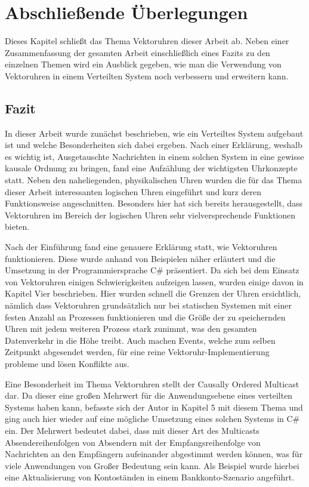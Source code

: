 \section{Abschließende Überlegungen}
\label{cap:schluss}
Dieses Kapitel schließt das Thema Vektoruhren dieser Arbeit ab. Neben einer Zusammenfassung der gesamten Arbeit einschließlich eines Fazits zu den einzelnen Themen wird ein Ausblick gegeben, wie man die Verwendung von Vektoruhren in einem Verteilten System noch verbessern und erweitern kann.
\subsection{Fazit}
In dieser Arbeit wurde zunächst beschrieben, wie ein Verteiltes System aufgebaut ist und welche Besonderheiten sich dabei ergeben. Nach einer Erklärung, weshalb es wichtig ist, Ausgetauschte Nachrichten in einem solchen System in eine gewisse kausale Ordnung zu bringen, fand eine Aufzählung der wichtigsten Uhrkonzepte statt. Neben den naheliegenden, physikalischen Uhren wurden die für das Thema dieser Arbeit interessanten logischen Uhren eingeführt und kurz deren Funktionsweise angeschnitten. Besonders hier hat sich bereits herausgestellt, dass Vektoruhren im Bereich der logischen Uhren sehr vielversprechende Funktionen bieten.

Nach der Einführung fand eine genauere Erklärung statt, wie Vektoruhren funktionieren. Diese wurde anhand von Beispielen näher erläutert und die Umsetzung in der Programmiersprache C\# präsentiert. Da sich bei dem Einsatz von Vektoruhren einigen Schwierigkeiten aufzeigen lassen, wurden einige davon in Kapitel Vier beschrieben. Hier wurden schnell die Grenzen der Uhren ersichtlich, nämlich dass Vektoruhren grundsätzlich nur bei statischen Systemen mit einer festen Anzahl an Prozessen funktionieren und die Größe der zu speichernden Uhren mit jedem weiteren Prozess stark zunimmt, was den gesamten Datenverkehr in die Höhe treibt. Auch machen Events, welche zum selben Zeitpunkt abgesendet werden, für eine reine Vektoruhr-Implementierung probleme und lösen Konflikte aus.

Eine Besonderheit im Thema Vektoruhren stellt der Causally Ordered Multicast dar. Da dieser eine großen Mehrwert für die Anwendungsebene eines verteilten Systems haben kann, befasste sich der Autor in Kapitel 5 mit diesem Thema und ging auch hier wieder auf eine mögliche Umsetzung eines solchen Systems in C\# ein. Der Mehrwert bedeutet dabei, dass mit dieser Art des Multicasts Absendereihenfolgen von Absendern mit der Empfangsreihenfolge von Nachrichten an den Empfängern aufeinander abgestimmt werden können, was für viele Anwendungen von Großer Bedeutung sein kann. Als Beispiel wurde hierbei eine Aktualisierung von Kontoständen in einem Bankkonto-Szenario angeführt.

